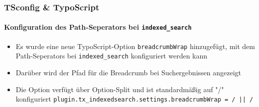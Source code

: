 \begin{frame}[fragile]
	\frametitle{TSconfig \& TypoScript}
	\framesubtitle{Konfiguration des Path-Seperators bei \texttt{indexed\_search}}

	\lstset{basicstyle=\tiny\ttfamily}

	\begin{itemize}

		\item Es wurde eine neue TypoScript-Option \texttt{breadcrumbWrap} hinzugefügt, mit dem
			Path-Seperators bei \texttt{indexed\_search} konfiguriert werden kann

		\item Darüber wird der Pfad für die Breadcrumb bei Suchergebnissen angezeigt

		\item Die Option verfügt über Option-Split und ist standardmäßig auf "/" konfiguriert\newline
			\small
				\texttt{plugin.tx\_indexedsearch.settings.breadcrumbWrap = / || /}
			\normalsize

	\end{itemize}

\end{frame}

